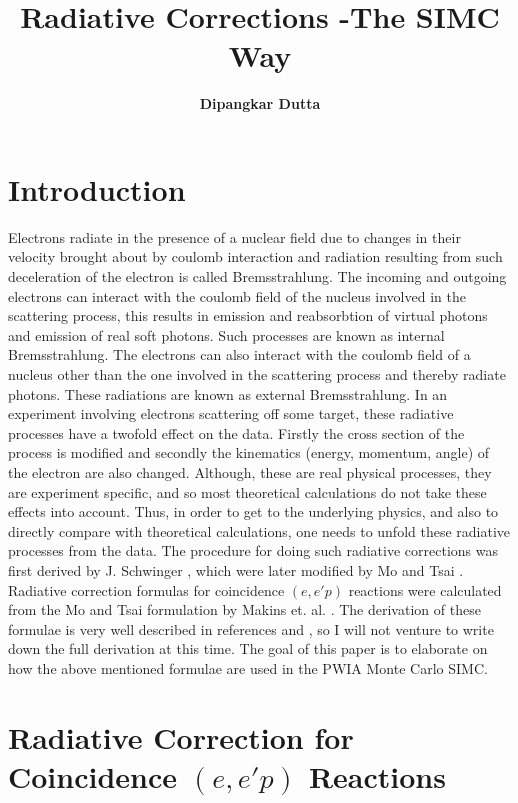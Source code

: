 

\title{Radiative Corrections -The SIMC Way}
\author{\bf{Dipangkar Dutta}}
\maketitle

\section*{Introduction}
Electrons radiate in the presence of a nuclear field due to changes in their velocity brought about by coulomb interaction and radiation resulting from
such deceleration of the electron is called Bremsstrahlung. The incoming and outgoing electrons can interact with the coulomb field of the nucleus involved in the scattering process, this results in emission and reabsorbtion of  virtual photons and emission of real soft photons. Such processes are known as internal Bremsstrahlung. The electrons can also interact with the coulomb field of a nucleus other than the one involved in the scattering process and thereby radiate photons. These radiations are known as external Bremsstrahlung. In an experiment
involving electrons scattering off some target, these radiative processes have a twofold effect on the data. Firstly the cross section of the process is modified  and secondly the kinematics (energy, momentum, angle) of the electron are also changed. Although, these are real physical processes, they are experiment specific, and so most theoretical calculations do not take 
these effects into account. Thus, in
order to get to the underlying physics, and also to directly compare with theoretical calculations, one needs to unfold these radiative processes from the data.
The procedure for doing such radiative corrections was first derived by J. Schwinger \cite{jsw}, which were later modified by Mo and Tsai \cite{mots}.  
Radiative correction formulas for coincidence $(e,e'p)$ reactions were calculated from the Mo and Tsai formulation by Makins et. al. \cite{mak1}. The derivation of these formulae is very well described in
references \cite{mak1} and \cite{mak2}, so I will not venture to write down the full derivation at this time. The goal of this paper is to elaborate on how the above mentioned formulae are used in the PWIA Monte Carlo SIMC.

\section*{Radiative Correction for Coincidence {\lowercase{\bf{\large{$(e,e'p)$}}}} Reactions}

